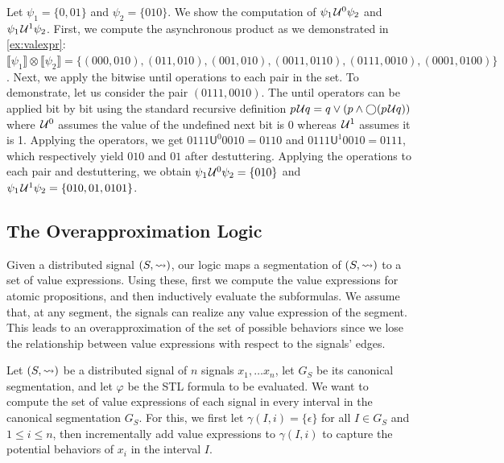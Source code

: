 \begin{example}
	Let $\psi_1 = \{ 0, 01 \}$ and $\psi_2 = \{ 010 \}$.
	We show the computation of $\psi_1 \kern.1em\mathcal{U}^0 \psi_2$ and $\psi_1 \kern.1em\mathcal{U}^1 \psi_2$.
	First, we compute the asynchronous product as we demonstrated in \cref{ex:valexpr}: $\llbracket \psi_1 \rrbracket \otimes \llbracket \psi_2 \rrbracket = \{ (000,010), (011,010), (001,010), (0011,0110), (0111,0010), (0001,0100)\}$.
	Next, we apply the bitwise until operations to each pair in the set.
	To demonstrate, let us consider the pair $(0111,0010)$.
	The until operators can be applied bit by bit using the standard recursive definition $p \kern.1em\mathcal{U} q = q \lor (p \land \bigcirc (p \kern.1em\mathcal{U} q))$ where $\kern.1em\mathcal{U}^0$ assumes the value of the undefined next bit is 0 whereas $\kern.1em\mathcal{U}^1$ assumes it is 1.
	Applying the operators, we get $0111 \mathsf{U}^0 0010 = 0110$ and $0111 \mathsf{U}^1 0010 = 0111$, which respectively yield $010$ and $01$ after destuttering.
	Applying the operations to each pair and destuttering, we obtain $\psi_1 \kern.1em\mathcal{U}^0 \psi_2 = \{ 010 \}$ and $\psi_1 \kern.1em\mathcal{U}^1 \psi_2 = \{ 010, 01, 0101\}$.
\end{example}

\subsection{The Overapproximation Logic}
Given a distributed signal $(S,{\rightsquigarrow})$, our logic maps a segmentation of $(S,{\rightsquigarrow})$ to a set of value expressions.
Using these, first we compute the value expressions for atomic propositions, and then inductively evaluate the subformulas.
We assume that, at any segment, the signals can realize any value expression of the segment.
This leads to an overapproximation of the set of possible behaviors since we lose the relationship between value expressions with respect to the signals' edges.

Let $(S,{\rightsquigarrow})$ be a distributed signal of $n$ signals $x_1, \ldots x_n$, let $G_S$ be its canonical segmentation, and let $\varphi$ be the STL formula to be evaluated.
We want to compute the set of value expressions of each signal in every interval in the canonical segmentation $G_S$.
For this, we first let $\gamma(I, i) = \{\epsilon\}$ for all $I \in G_S$ and $1 \leq i \leq n$, then incrementally add value expressions to $\gamma(I, i)$ to capture the potential behaviors of $x_i$ in the interval $I$.

